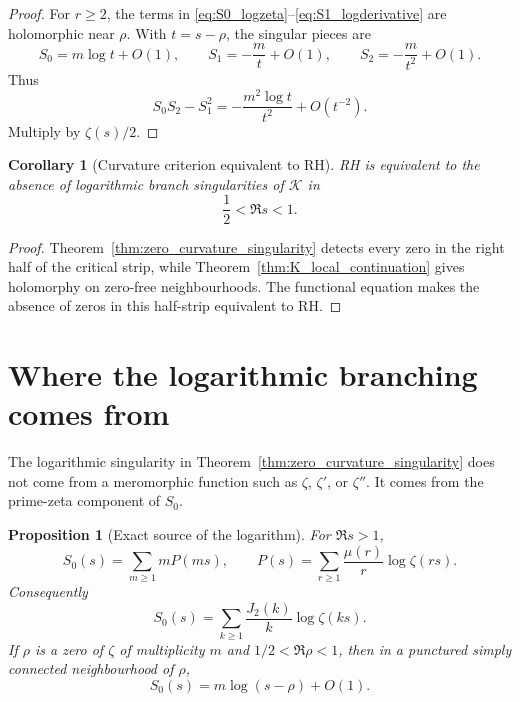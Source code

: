 \documentclass[11pt]{amsart}
\numberwithin{equation}{section}
\theoremstyle{plain}
\newtheorem{proposition}[theorem]{Proposition}
\newtheorem{corollary}[theorem]{Corollary}
\theoremstyle{definition}
\theoremstyle{remark}
\begin{document}
\begin{proof}
For \(r\ge2\), the terms in
\eqref{eq:S0_logzeta}--\eqref{eq:S1_logderivative} are holomorphic near
\(\rho\). With \(t=s-\rho\), the singular pieces are
\begin{equation}
S_0=m\log t+O(1),\qquad
S_1=-\frac mt+O(1),\qquad
S_2=-\frac m{t^2}+O(1).
\label{eq:S012_near_zero}
\end{equation}
Thus
\begin{equation}
S_0S_2-S_1^2=-\frac{m^2\log t}{t^2}+O(t^{-2}).
\label{eq:det_near_zero}
\end{equation}
Multiply by \(\zeta(s)/2\).
\end{proof}

\begin{corollary}[Curvature criterion equivalent to RH]
\label{cor:curvature_RH_criterion}
RH is equivalent to the absence of logarithmic branch singularities of
\(\mathcal K\) in
\begin{equation}
\boxed{\frac12<\Re s<1.}
\label{eq:RH_curvature_halfstrip}
\end{equation}
\end{corollary}

\begin{proof}
Theorem~\ref{thm:zero_curvature_singularity} detects every zero in the right
half of the critical strip, while Theorem~\ref{thm:K_local_continuation}
gives holomorphy on zero-free neighbourhoods. The functional equation makes
the absence of zeros in this half-strip equivalent to RH.
\end{proof}


\section{Where the logarithmic branching comes from}
\label{sec:prime_zeta_branching}

The logarithmic singularity in Theorem~\ref{thm:zero_curvature_singularity}
does not come from a meromorphic function such as \(\zeta\), \(\zeta'\), or
\(\zeta''\).  It comes from the prime-zeta component of \(S_0\).

\begin{proposition}[Exact source of the logarithm]
\label{prop:source_of_logarithm}
For \(\Re s>1\),
\begin{equation}
S_0(s)=\sum_{m\ge1}mP(ms),
\qquad
P(s)=\sum_{r\ge1}\frac{\mu(r)}{r}\log\zeta(rs).
\label{eq:S0_prime_zeta_source}
\end{equation}
Consequently
\begin{equation}
S_0(s)=\sum_{k\ge1}\frac{J_2(k)}{k}\log\zeta(ks).
\label{eq:S0_branch_expansion}
\end{equation}
If \(\rho\) is a zero of \(\zeta\) of multiplicity \(m\) and
\(1/2<\Re\rho<1\), then in a punctured simply connected neighbourhood of
\(\rho\),
\begin{equation}
S_0(s)=m\log(s-\rho)+O(1).
\label{eq:S0_local_log_source}
\end{equation}
\end{proposition}
\end{document}
